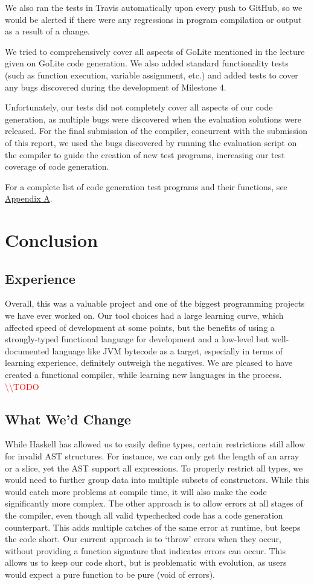 \documentclass[11pt]{article}
\newcommand{\todo}[0]{\textcolor{red}{\textbackslash\textbackslash TODO \ }}
\begin{document}
We also ran the tests in Travis automatically upon every push to GitHub,
so we would be alerted if there were any regressions in program compilation
or output as a result of a change.

We tried to comprehensively cover all aspects of GoLite mentioned in the
lecture given on GoLite code generation. We also added standard functionality
tests (such as function execution, variable assignment, etc.) and added tests
to cover any bugs discovered during the development of Milestone 4.

Unfortunately, our tests did not completely cover all aspects of our code
generation, as multiple bugs were discovered when the evaluation solutions
were released. For the final submission of the compiler, concurrent with the
submission of this report, we used the bugs discovered by running the evaluation
script on the compiler to guide the creation of new test programs, increasing our
test coverage of code generation.

For a complete list of code generation test programs and their functions, see
\hyperref[sec:appendixa]{Appendix A}.

\section{Conclusion}
\subsection{Experience}
Overall, this was a valuable project and one of the biggest programming projects
we have ever worked on. Our tool choices had a large learning curve, which
affected speed of development at some points, but the benefits of using a
strongly-typed functional language for development and a low-level but
well-documented language like JVM bytecode as a target, especially in terms of
learning experience, definitely outweigh the negatives. 
We are pleased to have created a functional compiler, while learning new languages in the process.
\todo

\subsection{What We'd Change}

While Haskell has allowed us to easily define types, certain
restrictions still allow for invalid AST structures.  For instance, we
can only get the length of an array or a slice, yet the AST support
all expressions.  To properly restrict all types, we would need to
further group data into multiple subsets of constructors\cite{so:pattern/matching/subset}.  While this
would catch more problems at compile time, it will also make the code
significantly more complex.  The other approach is to allow errors at
all stages of the compiler, even though all valid typechecked code has
a code generation counterpart.  This adds multiple catches of the same error
at runtime, but keeps the code short.  Our current approach is to
`throw' errors when they occur, without providing a function signature
that indicates errors can occur.  This allows us to keep our code
short, but is problematic with evolution, as users would expect a pure
function to be pure (void of errors).
\end{document}
